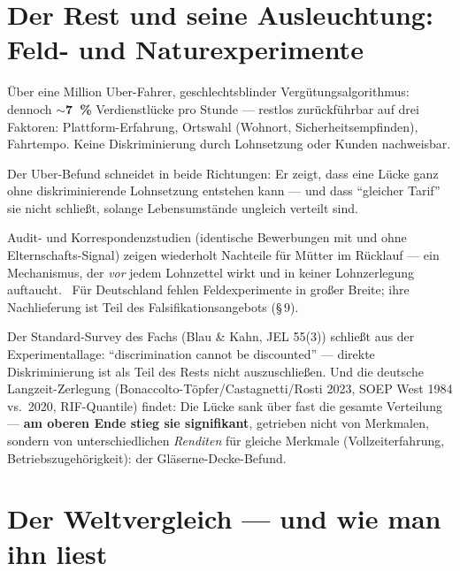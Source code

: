 \section{Der Rest und seine Ausleuchtung: Feld- und Naturexperimente}

\begin{datenbox}
\"Uber eine Million Uber-Fahrer, geschlechtsblinder Verg\"utungsalgorithmus:
dennoch \textbf{\(\sim\)7~\%} Verdienstl\"ucke pro Stunde --- restlos
zur\"uckf\"uhrbar auf drei Faktoren: Plattform-Erfahrung, Ortswahl (Wohnort,
Sicherheitsempfinden), Fahrtempo. Keine Diskriminierung durch Lohnsetzung oder
Kunden nachweisbar. \belegt
\end{datenbox}

Der Uber-Befund schneidet in beide Richtungen: Er zeigt, dass eine L\"ucke ganz
ohne diskriminierende Lohnsetzung entstehen kann --- und dass \enquote{gleicher
Tarif} sie nicht schlie\ss t, solange Lebensumst\"ande ungleich verteilt sind.

Audit- und Korrespondenzstudien (identische Bewerbungen mit und ohne
Elternschafts-Signal) zeigen wiederholt Nachteile f\"ur M\"utter im R\"ucklauf
--- ein Mechanismus, der \emph{vor} jedem Lohnzettel wirkt und in keiner
Lohnzerlegung auftaucht. \plausibel\ F\"ur Deutschland fehlen Feldexperimente in
gro\ss er Breite; ihre Nachlieferung ist Teil des Falsifikationsangebots
(\S\,9).

\begin{datenbox}
Der Standard-Survey des Fachs (Blau \& Kahn, JEL 55(3)) schlie\ss t aus der
Experimentallage: \enquote{discrimination cannot be discounted} --- direkte
Diskriminierung ist als Teil des Rests nicht auszuschlie\ss en. Und die deutsche
Langzeit-Zerlegung (Bonaccolto-T\"opfer/Castagnetti/Rosti 2023, SOEP West
1984 vs.\ 2020, RIF-Quantile) findet: Die L\"ucke sank \"uber fast die gesamte
Verteilung --- \textbf{am oberen Ende stieg sie signifikant}, getrieben nicht von
Merkmalen, sondern von unterschiedlichen \emph{Renditen} f\"ur gleiche Merkmale
(Vollzeiterfahrung, Betriebszugeh\"origkeit): der Gl\"aserne-Decke-Befund. \belegt
\end{datenbox}

\section{Der Weltvergleich --- und wie man ihn liest}

